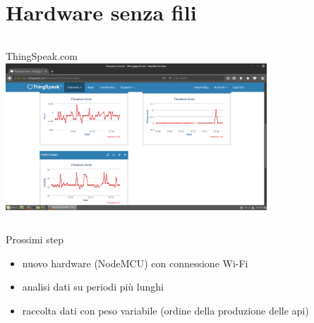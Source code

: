 \documentclass{beamer}
\begin{document}
\section{Hardware senza fili}
\begin{frame}
  \begin{columns}[c]
    \Large{ThingSpeak.com}\\
    \includegraphics[height=5.5cm]{../../logbook/presentazione/img/thingspeak_00.png}
  \end{columns}
\end{frame}



\begin{frame}
  \Large{Prossimi step}
  \begin{itemize}
    \item nuovo hardware (NodeMCU) con connessione Wi-Fi
    \item analisi dati su periodi pi\`u lunghi
    \item raccolta dati con peso variabile (ordine della produzione delle api)
  \end{itemize}
\end{frame}
\end{document}
